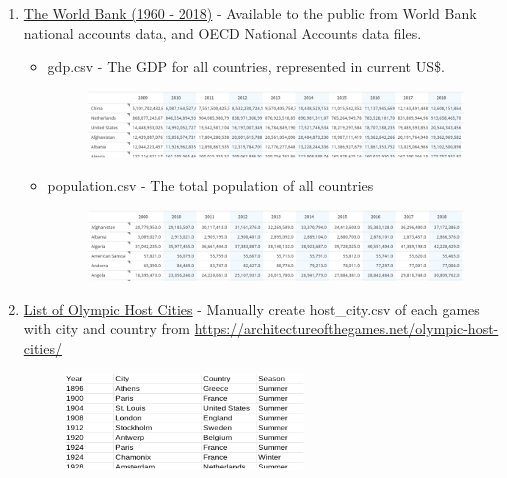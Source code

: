 \documentclass[a4 paper, 12pt]{memoir}
\begin{document}
\begin{enumerate}
        \item \underline{The World Bank (1960 - 2018)} - Available to the public from World Bank national accounts data, and OECD National Accounts data files.
            \begin{itemize}
                \item gdp.csv - The GDP for all countries, represented in current US\$.
                    \begin{figure} [H]
                        \centering
                        \includegraphics[width=\textwidth, frame]
                            {../images/gdp_data.png}                    
                    \end{figure}  
                \item population.csv - The total population of all countries
                    \begin{figure} [H]
                        \centering
                        \includegraphics[width=\textwidth, frame]
                            {../images/pop_data.png}                    
                    \end{figure}  
            \end{itemize}
    
        \item \underline{List of Olympic Host Cities} - Manually create host\_city.csv of each games with city and country from \url{https://architectureofthegames.net/olympic-host-cities/}
            \begin{figure} [H]
                \centering
                \includegraphics[width=0.6\textwidth, frame]
                    {../images/host_data.png}                    
            \end{figure}  
    \end{enumerate}
    
\end{document}
